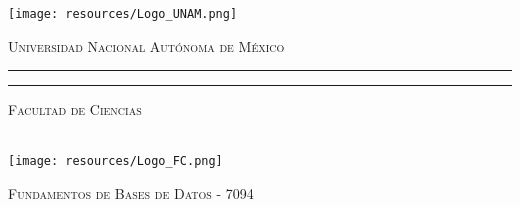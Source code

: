\begin{titlepage}
	\thispagestyle{empty}
	\begin{minipage}[c][0.17\textheight][c]{0.25\textwidth}
		\begin{center}
			\texttt{[image: resources/Logo\_UNAM.png]}
		\end{center}
	\end{minipage}
	\begin{minipage}[c][0.195\textheight][t]{0.75\textwidth}
		\begin{center}
			\vspace{0.3cm}
			\textsc{\large Universidad Nacional Aut\'onoma de M\'exico}\\[0.5cm]
			\vspace{0.3cm}
			\hrule height2.5pt
			\vspace{.2cm}
			\hrule height1pt
			\vspace{.8cm}
			\textsc{Facultad de Ciencias}\\[0.5cm] %
		\end{center}
	\end{minipage}
	
	\begin{minipage}[c][0.81\textheight][t]{0.25\textwidth}
		\vspace*{5mm}
		\begin{center}
			\hskip2.0mm
			\vrule width1pt height13cm 
			\vspace{5mm}
			\hskip2pt
			\vrule width2.5pt height13cm
			\hskip2mm
			\vrule width1pt height13cm \\
			\vspace{5mm}
			\texttt{[image: resources/Logo\_FC.png]}
		\end{center}
	\end{minipage}
	\begin{minipage}[c][0.81\textheight][t]{0.75\textwidth}
		\begin{center}
			\vspace{1cm}
			
			{\large\scshape Fundamentos de Bases de Datos - 7094}\\[.2in]
			
			\vspace{2cm}            
			

\end{center}
\end{minipage}
\end{titlepage}
